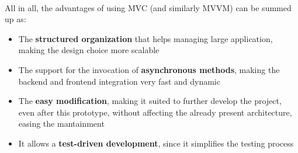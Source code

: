 \documentclass[table, 12pt]{article}
\begin{document}
\paragraph{}
All in all, the advantages of using MVC (and similarly MVVM) can be summed up as: 
\begin{itemize}
    \item The \textbf{structured organization} that helps managing large application, making the design choice more scalable
    \item The support for the invocation of \textbf{asynchronous methods}, making the backend and frontend integration very fast and dynamic
    \item The \textbf{easy modification}, making it suited to further develop the project, even after this prototype, without affecting the already present architecture, easing the mantainment
    \item It allows a \textbf{test-driven development}, since it simplifies the testing process
\end{itemize}
\end{document}
